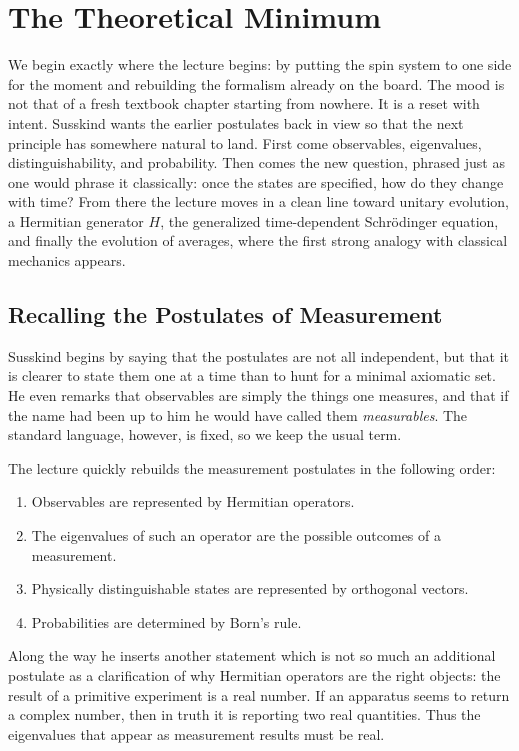 \chapter{The Theoretical Minimum}

We begin exactly where the lecture begins: by putting the spin system to one side for the moment and rebuilding the formalism already on the board. The mood is not that of a fresh textbook chapter starting from nowhere. It is a reset with intent. Susskind wants the earlier postulates back in view so that the next principle has somewhere natural to land. First come observables, eigenvalues, distinguishability, and probability. Then comes the new question, phrased just as one would phrase it classically: once the states are specified, how do they change with time? From there the lecture moves in a clean line toward unitary evolution, a Hermitian generator \(H\), the generalized time-dependent Schr\"odinger equation, and finally the evolution of averages, where the first strong analogy with classical mechanics appears.

\section{Recalling the Postulates of Measurement}

Susskind begins by saying that the postulates are not all independent, but that it is clearer to state them one at a time than to hunt for a minimal axiomatic set. He even remarks that observables are simply the things one measures, and that if the name had been up to him he would have called them \emph{measurables}. The standard language, however, is fixed, so we keep the usual term.

The lecture quickly rebuilds the measurement postulates in the following order:
\begin{enumerate}
\item Observables are represented by Hermitian operators.
\item The eigenvalues of such an operator are the possible outcomes of a measurement.
\item Physically distinguishable states are represented by orthogonal vectors.
\item Probabilities are determined by Born's rule.
\end{enumerate}

Along the way he inserts another statement which is not so much an additional postulate as a clarification of why Hermitian operators are the right objects: the result of a primitive experiment is a real number. If an apparatus seems to return a complex number, then in truth it is reporting two real quantities. Thus the eigenvalues that appear as measurement results must be real.


